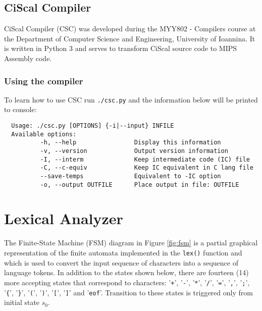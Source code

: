 \documentclass{article}
\def\code#1{\texttt{#1}} %
\begin{document}
\subsection{CiScal Compiler}
CiScal Compiler (CSC) was developed during the MYY802 - Compilers course at the Department of
Computer Science and Engineering, University of Ioannina. It is written in Python 3 and serves
to transform CiScal source code to MIPS Assembly code.

\subsubsection{Using the compiler}
To learn how to use CSC run \verb|./csc.py| and the information below will be printed to console:

\begin{verbatim}
  Usage: ./csc.py [OPTIONS] {-i|--input} INFILE
  Available options:
          -h, --help                Display this information
          -v, --version             Output version information
          -I, --interm              Keep intermediate code (IC) file
          -C, --c-equiv             Keep IC equivalent in C lang file
          --save-temps              Equivalent to -IC option
          -o, --output OUTFILE      Place output in file: OUTFILE
\end{verbatim}

\pagebreak


\section{Lexical Analyzer}

The Finite-State Machine (FSM) diagram in Figure \ref{fig:fsm} is a partial graphical representation of the
finite automata implemented in the \code{lex()} function and which is used to convert the input
sequence of characters into a sequence of language tokens. In addition to the states shown below,
there are fourteen (14) more accepting states that correspond to characters: '\code{+}', '\code{-}', '\code{*}', 
'\code{/}', '\code{=}', '\code{,}', '\code{;}', '\code{\{}', '\code{\}}', '\code{(}', '\code{)}', 
'\code{[}', '\code{]}' and '\code{eof}'. Transition to these states is triggered only from initial state $s_0$.
\vspace{1cm}
\end{document}
